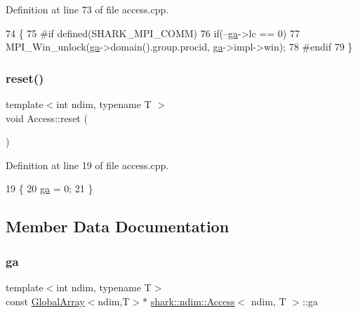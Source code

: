 Definition at line 73 of file access.\+cpp.


\begin{DoxyCode}
74 \{
75 \textcolor{preprocessor}{    #if defined(SHARK\_MPI\_COMM)}
76         \textcolor{keywordflow}{if}(--\hyperlink{classshark_1_1ndim_1_1_access_abc59e261a07fcecc3f1db641ef04efa7}{ga}->lc == 0)
77             MPI\_Win\_unlock(\hyperlink{classshark_1_1ndim_1_1_access_abc59e261a07fcecc3f1db641ef04efa7}{ga}->domain().group.procid, \hyperlink{classshark_1_1ndim_1_1_access_abc59e261a07fcecc3f1db641ef04efa7}{ga}->impl->win);
78 \textcolor{preprocessor}{    #endif}
79 \}
\end{DoxyCode}
\hypertarget{classshark_1_1ndim_1_1_access_ae3aeb7637a41a2da81bcda20772ccac4}{}\label{classshark_1_1ndim_1_1_access_ae3aeb7637a41a2da81bcda20772ccac4} 
\subsubsection{\texorpdfstring{reset()}{reset()}}
{\footnotesize\ttfamily template$<$int ndim, typename T $>$ \\
void Access\+::reset (\begin{DoxyParamCaption}{ }\end{DoxyParamCaption})\hspace{0.3cm}{\ttfamily [private]}}



Definition at line 19 of file access.\+cpp.


\begin{DoxyCode}
19                            \{
20     \hyperlink{classshark_1_1ndim_1_1_access_abc59e261a07fcecc3f1db641ef04efa7}{ga} = 0;
21 \}
\end{DoxyCode}


\subsection{Member Data Documentation}
\hypertarget{classshark_1_1ndim_1_1_access_abc59e261a07fcecc3f1db641ef04efa7}{}\label{classshark_1_1ndim_1_1_access_abc59e261a07fcecc3f1db641ef04efa7} 
\subsubsection{\texorpdfstring{ga}{ga}}
{\footnotesize\ttfamily template$<$int ndim, typename T$>$ \\
const \hyperlink{classshark_1_1ndim_1_1_global_array}{Global\+Array}$<$ndim,T$>$$\ast$ \hyperlink{classshark_1_1ndim_1_1_access}{shark\+::ndim\+::\+Access}$<$ ndim, T $>$\+::ga\hspace{0.3cm}{\ttfamily [private]}}



